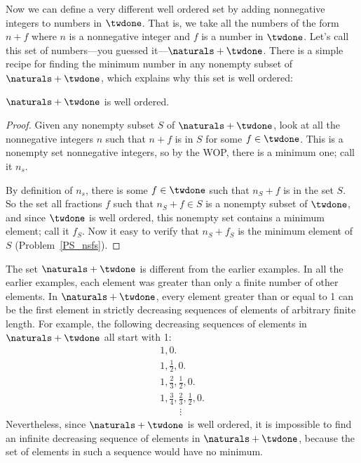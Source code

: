 Now we can define a very different well ordered set by adding
nonnegative integers to numbers in $\twdone$.  That is, we take all
the numbers of the form $n + f$ where $n$ is a nonnegative integer and
$f$ is a number in $\twdone$.  Let's call this set of numbers---you
guessed it---$\naturals + \twdone$.  There is a simple recipe for
finding the minimum number in any nonempty subset of $\naturals +
\twdone$, which explains why this set is well ordered:

\begin{lemma}\label{to1_well-order}
$\naturals + \twdone$ is well ordered.
\end{lemma}

\begin{proof}
Given any nonempty subset $S$ of $\naturals + \twdone$, look at all
the nonnegative integers $n$ such that $n+f$ is in $S$ for some $f
\in \twdone$.  This is a nonempty set nonnegative integers, so by the
WOP, there is a minimum one; call it $n_s$.

By definition of $n_s$, there is some $f \in \twdone$ such that
$n_S+f$ is in the set $S$.  So the set all fractions $f$ such that
$n_S+f \in S$ is a nonempty subset of $\twdone$, and since $\twdone$ is
well ordered, this nonempty set contains a minimum element; call it
$f_S$.  Now it easy to verify that $n_S+f_S$ is
the minimum element of $S$ (Problem~\ref{PS_nsfs}).
\end{proof}

The set $\naturals + \twdone$ is different from the earlier examples.
In all the earlier examples, each element was greater than
only a finite number of other elements.  In $\naturals + \twdone$, every
element greater than or equal to 1 can be the first element in
strictly decreasing sequences of elements of arbitrary finite length.
For example, the following decreasing sequences of elements in
$\naturals + \twdone$ all start with 1:
\[\begin{array}{l}
1, 0.\\
1, \frac12, 0.\\
1, \frac23, \frac12, 0.\\
1,  \frac34, \frac23, \frac12, 0.\\
\qquad\vdots
\end{array}\]
Nevertheless, since $\naturals + \twdone$ is well ordered, it is
impossible to find an infinite decreasing sequence of elements in
$\naturals + \twdone$, because the set of elements in such a sequence
would have no minimum.

\begin{problems}
\homeworkproblems
{}

\practiceproblems
{}

\classproblems
{}

\end{problems}
\endinput
